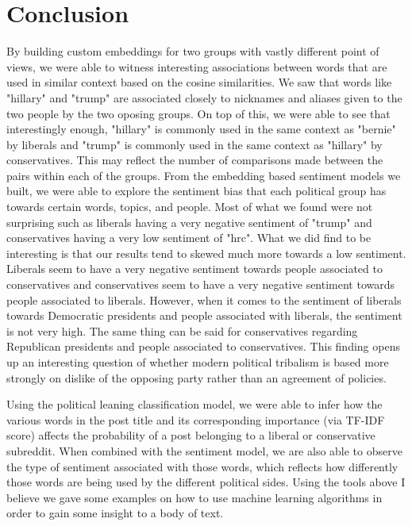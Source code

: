 \documentclass[conference]{IEEEtran}
\begin{document}
\section{Conclusion}
By building custom embeddings for two groups with vastly different point of views, we were able to witness interesting associations between words that are used in similar context based on the cosine similarities. We saw that words like "hillary" and "trump" are associated closely to nicknames and aliases given to the two people by the two oposing groups. On top of this, we were able to see that interestingly enough, "hillary" is commonly used in the same context as "bernie" by liberals and "trump" is commonly used in the same context as "hillary" by conservatives. This may reflect the number of comparisons made between the pairs within each of the groups.
From the embedding based sentiment models we built, we were able to explore the sentiment bias that each political group has towards certain words, topics, and people. Most of what we found were not surprising such as liberals having a very negative sentiment of "trump" and conservatives having a very low sentiment of "hrc". What we did find to be interesting is that our results tend to skewed much more towards a low sentiment. Liberals seem to have a very negative sentiment towards people associated to conservatives and conservatives seem to have a very negative sentiment towards people associated to liberals. However, when it comes to the sentiment of liberals towards Democratic presidents and people associated with liberals, the sentiment is not very high. The same thing can be said for conservatives regarding Republican presidents and people associated to conservatives. This finding opens up an interesting question of whether modern political tribalism is based more strongly on dislike of the opposing party rather than an agreement of policies.

Using the political leaning classification model, we were able to infer how the various words in the post title and its corresponding importance (via TF-IDF score) affects the probability of a post belonging to a liberal or conservative subreddit. When combined with the sentiment model, we are also able to observe the type of sentiment associated with those words, which reflects how differently those words are being used by the different political sides. Using the tools above I believe we gave some examples on how to use machine learning algorithms in order to gain some insight to a body of text.

\vspace{-2mm}


\end{document}
